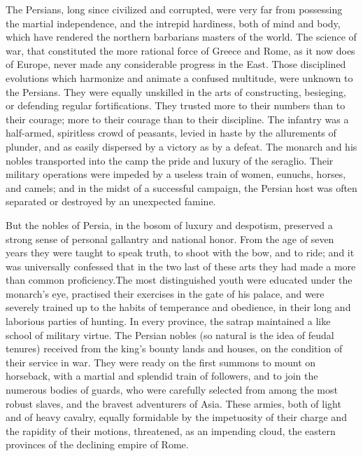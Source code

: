 The Persians, long since civilized and corrupted, were very far
from possessing the martial independence, and the intrepid
hardiness, both of mind and body, which have rendered the
northern barbarians masters of the world. The science of war,
that constituted the more rational force of Greece and Rome, as
it now does of Europe, never made any considerable progress in
the East. Those disciplined evolutions which harmonize and
animate a confused multitude, were unknown to the Persians. They
were equally unskilled in the arts of constructing, besieging, or
defending regular fortifications. They trusted more to their
numbers than to their courage; more to their courage than to
their discipline. The infantry was a half-armed, spiritless crowd
of peasants, levied in haste by the allurements of plunder, and
as easily dispersed by a victory as by a defeat. The monarch and
his nobles transported into the camp the pride and luxury of the
seraglio. Their military operations were impeded by a useless
train of women, eunuchs, horses, and camels; and in the midst of
a successful campaign, the Persian host was often separated or
destroyed by an unexpected famine.\footnotemark[56]


But the nobles of Persia, in the bosom of luxury and despotism,
preserved a strong sense of personal gallantry and national
honor. From the age of seven years they were taught to speak
truth, to shoot with the bow, and to ride; and it was universally
confessed that in the two last of these arts they had made a more
than common proficiency.\footnotemark[57] The most distinguished youth were
educated under the monarch’s eye, practised their exercises in
the gate of his palace, and were severely trained up to the
habits of temperance and obedience, in their long and laborious
parties of hunting. In every province, the satrap maintained a
like school of military virtue. The Persian nobles (so natural is
the idea of feudal tenures) received from the king’s bounty lands
and houses, on the condition of their service in war. They were
ready on the first summons to mount on horseback, with a martial
and splendid train of followers, and to join the numerous bodies
of guards, who were carefully selected from among the most robust
slaves, and the bravest adventurers of Asia. These armies, both
of light and of heavy cavalry, equally formidable by the
impetuosity of their charge and the rapidity of their motions,
threatened, as an impending cloud, the eastern provinces of the
declining empire of Rome.\footnotemark[58]



